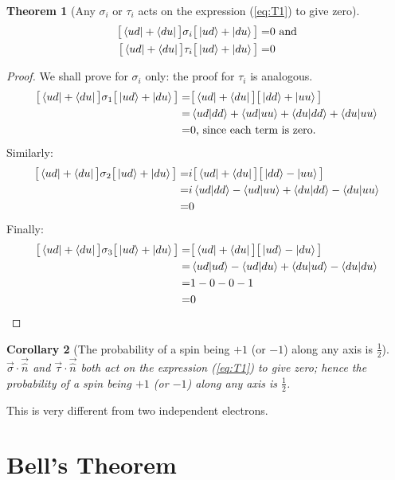 \documentclass[]{article}
\newtheorem{thm}{Theorem}
\newtheorem{cor}[thm]{Corollary}
\begin{document}
\begin{thm}[Any $\sigma_i$ or $\tau_i$ acts on the expression (\ref{eq:T1}) to give zero]
	\begin{align*}
		\big[\bra{ud}+\bra{du}\big]\sigma_i\big[\ket{ud}+\ket{du}\big]=&0 \text{ and}\\
		\big[\bra{ud}+\bra{du}\big]\tau_i\big[\ket{ud}+\ket{du}\big]=&0
	\end{align*}
\end{thm}
\begin{proof}
	We shall prove for $\sigma_i$ only: the proof for $\tau_i$ is analogous.
	\begin{align*}
		\big[\bra{ud}+\bra{du}\big]\sigma_1\big[\ket{ud}+\ket{du}\big]=&\big[\bra{ud}+\bra{du}\big]\big[\ket{dd}+\ket{uu}\big]\\
		=&\braket{ud\vert dd} + \braket{ud\vert uu} + \braket{du\vert dd} + \braket{du\vert uu}\\
		=&0 \text{, since each term is zero.}
	\end{align*}
	Similarly:
	\begin{align*}
		\big[\bra{ud}+\bra{du}\big]\sigma_2\big[\ket{ud}+\ket{du}\big]=&i\big[\bra{ud}+\bra{du}\big]\big[\ket{dd}-\ket{uu}\big]\\
		=&i\braket{ud\vert dd} - \braket{ud\vert uu} + \braket{du\vert dd} - \braket{du\vert uu}\\
		=&0
	\end{align*}
	Finally:
	\begin{align*}
		\big[\bra{ud}+\bra{du}\big]\sigma_3\big[\ket{ud}+\ket{du}\big]=&\big[\bra{ud}+\bra{du}\big]\big[\ket{ud}-\ket{du}\big]\\
		=& \braket{ud\vert ud} - \braket{ud\vert du} + \braket{du\vert ud} - \braket{du\vert du}\\
		=& 1 -0 -0 -1\\
		=&0
	\end{align*}
\end{proof}
\begin{cor}[The probability of a spin being $+1$ (or $-1$) along any axis is $\frac{1}{2}$]
	$\vec{\sigma}\cdot\vec{\hat{n}}$ and $\vec{\tau}\cdot\vec{\hat{n}}$ both  act on the expression (\ref{eq:T1}) to give zero; hence the probability of a spin being $+1$ (or $-1$) along any axis is $\frac{1}{2}$.
\end{cor}

This is very different from two independent electrons.

\section{Bell's Theorem}
\end{document}
